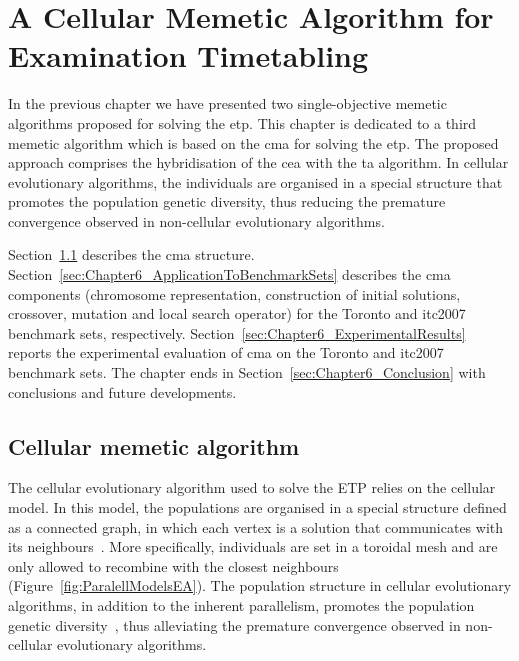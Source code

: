 \chapter{A Cellular Memetic Algorithm for Examination Timetabling} 
\label{ch:Chapter6}
\vfill \minitoc \newpage


In the previous chapter we have presented two single-objective memetic algorithms proposed for solving the \gls{etp}. This chapter is dedicated to a third memetic algorithm which is based on the \gls{cma} for solving the \gls{etp}. The proposed approach comprises the hybridisation of the \gls{cea} with the \gls{ta} algorithm. In cellular evolutionary algorithms, the individuals are organised in a special structure that promotes the population genetic diversity, thus reducing the premature convergence observed in non-cellular evolutionary algorithms. 

Section~\ref{sec:Chapter6_cMA} describes the \gls{cma} structure. Section~\ref{sec:Chapter6_ApplicationToBenchmarkSets} describes the \gls{cma} components (chromosome representation, construction of initial solutions, crossover, mutation and local search operator) for the Toronto and \gls{itc2007} benchmark sets, respectively. Section~\ref{sec:Chapter6_ExperimentalResults} reports the experimental evaluation of \gls{cma} on the Toronto and \gls{itc2007} benchmark sets. The chapter ends in Section~\ref{sec:Chapter6_Conclusion} with conclusions and future developments.
 



%
%
\section{Cellular memetic algorithm}
\label{sec:Chapter6_cMA}

The cellular evolutionary algorithm used to solve the ETP relies on the cellular model. In this model, the populations are organised in a special structure defined as a connected graph, in which each vertex is a solution that communicates with its neighbours~\citep{Alba2005a}. More specifically, individuals are set in a toroidal mesh and are only allowed to recombine with the closest neighbours (Figure~\ref{fig:ParalellModelsEA}). The population structure in cellular evolutionary algorithms, in addition to the inherent parallelism, promotes the population genetic diversity~\citep{Alba2005a}, thus alleviating the premature convergence observed in non-cellular evolutionary algorithms. 


